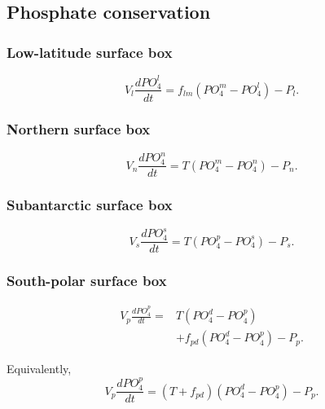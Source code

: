 \documentclass[11pt]{article}
\begin{document}
\subsection{Phosphate conservation}

\subsubsection{Low-latitude surface box}

\begin{equation}
V_l\frac{dPO_4^l}{dt}
=
f_{lm}
\left(
PO_4^m-PO_4^l
\right)
-
P_l.
\label{eq:seven_po4_l}
\end{equation}

\subsubsection{Northern surface box}

\begin{equation}
V_n\frac{dPO_4^n}{dt}
=
T
\left(
PO_4^m-PO_4^n
\right)
-
P_n.
\label{eq:seven_po4_n}
\end{equation}

\subsubsection{Subantarctic surface box}

\begin{equation}
V_s\frac{dPO_4^s}{dt}
=
T
\left(
PO_4^p-PO_4^s
\right)
-
P_s.
\label{eq:seven_po4_s}
\end{equation}

\subsubsection{South-polar surface box}

\begin{equation}
\begin{split}
V_p\frac{dPO_4^p}{dt}
={}&
T
\left(
PO_4^d-PO_4^p
\right)
\\
&+
f_{pd}
\left(
PO_4^d-PO_4^p
\right)
-
P_p.
\end{split}
\label{eq:seven_po4_p}
\end{equation}

Equivalently,
\begin{equation}
V_p\frac{dPO_4^p}{dt}
=
\left(T+f_{pd}\right)
\left(
PO_4^d-PO_4^p
\right)
-
P_p.
\label{eq:seven_po4_p_compact}
\end{equation}
\end{document}
